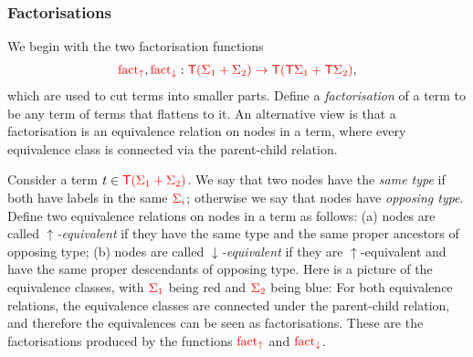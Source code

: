 \subsubsection{Factorisations}
\label{sec:factorisation-functions}
We begin with the two factorisation functions 
\begin{align*}
    {\color{red}{\mathrm{fact_{\uparrow}}}},{\color{red}{\mathrm{fact_{\downarrow}}}}  : {\color{red}{{\color{red}{\mathsf T}}(\Sigma_1+\Sigma_2) \to {\color{red}{\mathsf T}}({\color{red}{\mathsf T}}\Sigma_1 + {\color{red}{\mathsf T}}\Sigma_2)}},
\end{align*}
which are used to cut  terms into smaller parts. 
Define a \emph{factorisation} of a term   to be any term of terms that flattens to it.  An alternative view is that a factorisation is an equivalence relation on nodes in a term, where every equivalence class is connected via the parent-child relation.

Consider a  term $t \in {\color{red}{{\color{red}{\mathsf T}}({\color{red}{\Sigma}}_1 + {\color{red}{\Sigma}}_2)}}$.
        We say that two nodes have the \emph{same type} if both have labels in the same  ${\color{red}{\Sigma_i}}$; otherwise we say that nodes have \emph{opposing type}. Define  two equivalence relations on  nodes in a term as follows: (a) nodes are called  \emph{$\uparrow$-equivalent}  if they have the same type and the same proper ancestors of opposing type; (b) nodes are  called  \emph{$\downarrow$-equivalent}  if they  are $\uparrow$-equivalent and have the same proper descendants of opposing type.
           Here is a picture of the equivalence classes, with ${\color{red}{\Sigma_1}}$ being red and ${\color{red}{\Sigma_2}}$ being blue: 
        For both  equivalence relations, the equivalence classes are connected  under the parent-child relation, and therefore the equivalences can be seen as factorisations. These are the factorisations  produced by the functions ${\color{red}{\mathrm{fact_{\uparrow}}}}$ and ${\color{red}{\mathrm{fact_{\downarrow}}}}$. 
    
